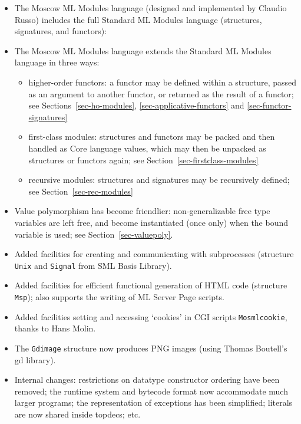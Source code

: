 \documentclass[fleqn,a4paper]{article}
\begin{document}
\begin{itemize}
\item The Moscow ML Modules language (designed and implemented by
  Claudio Russo) includes the full Standard ML Modules language
  (structures, signatures, and functors):
\item The Moscow ML Modules language extends the Standard ML Modules
  language in three ways:
  \begin{itemize}
  \item higher-order functors: a functor may be defined within
    a structure, passed as an argument to another functor, or 
    returned as the result
    of a functor; 
    see Sections~\ref{sec-ho-modules}, \ref{sec-applicative-functors} and \ref{sec-functor-signatures}
  \item first-class modules: structures and functors may be packed and
    then handled as Core language values, which may then be unpacked
    as structures or functors again; see
    Section~\ref{sec-firstclass-modules}
  \item recursive modules:  structures and  signatures may be
    recursively defined; see Section~\ref{sec-rec-modules}
  \end{itemize}

\item Value polymorphism has become friendlier: non-generalizable free
  type variables are left free, and become instantiated (once only)
  when the bound variable is used; see Section~\ref{sec-valuepoly}.
\item Added facilities for creating and communicating with
  subprocesses (structure \texttt{Unix} and \texttt{Signal} from SML
  Basis Library).
\item Added facilities for efficient functional generation of HTML
  code (structure \texttt{Msp}); also supports the writing of ML
  Server Page scripts.
\item Added facilities setting and accessing `cookies' in CGI scripts
  \texttt{Mosmlcookie}, thanks to Hans Molin.
\item The \texttt{Gdimage} structure now produces PNG images (using
  Thomas Boutell's gd library).
\item Internal changes: restrictions on datatype constructor ordering
  have been removed; the runtime system and bytecode format now
  accommodate much larger programs; the representation of exceptions
  has been simplified; literals are now shared inside topdecs; etc.
\end{itemize}
\end{document}

